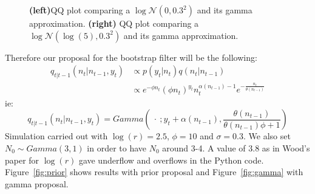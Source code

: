 \documentclass{article}
\begin{document}
\begin{figure}[htb]
\begin{minipage}{.45\textwidth}
	\end{minipage}
	\caption{\textbf{(left)}QQ plot comparing a $\log\mathcal{N}(0, 0.3^2)$ and its gamma approximation. \textbf{(right)} QQ plot comparing a $\log\mathcal{N}(\log(5), 0.3^2)$ and its gamma approximation.}
	\label{fig:approx}
\end{figure}

Therefore our proposal for the bootstrap filter will be the following:
\begin{equation*}
\begin{split}
q_{t|t-1}(n_t|n_{t-1}, y_t) & \propto  p(y_t|n_t)q(n_t|n_{t-1}) \\
& \propto e^{-\phi n_t}(\phi n_t)^{y_t}n_t^{\alpha(n_{t-1})-1}e^{-\frac{n_t}{\theta(n_{t-1})}}
\end{split}
\end{equation*}
ie:
\begin{equation*}
q_{t|t-1}(n_t|n_{t-1}, y_t) = Gamma(\ \cdot \ ; y_t+\alpha(n_{t-1}), \frac{\theta(n_{t-1})}{\theta(n_{t-1})\phi + 1})\end{equation*}
Simulation carried out with $\log(r)=2.5$, $\phi=10$ and $\sigma=0.3$. We also set $N_0 \sim Gamma(3,1)$ in order to have $N_0$ around 3-4. A value of 3.8 as in Wood's paper for $\log(r)$ gave underflow and overflows in the Python code. Figure~\ref{fig:prior} shows results with prior proposal and Figure~\ref{fig:gamma} with gamma proposal.
\end{document}
